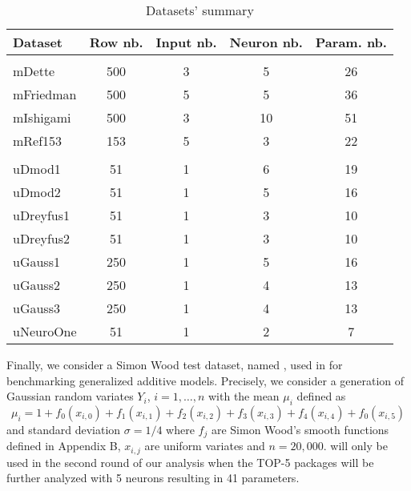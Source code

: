 \begin{Schunk}
\begin{table}

\caption{\label{tab:unnamed-chunk-2}Datasets' summary}
\centering
\fontsize{7}{9}\selectfont
\begin{tabular}[t]{lcccc}
\toprule
Dataset & Row nb. & Input nb. & Neuron nb. & Param. nb.\\
\midrule
\addlinespace[0.3em]
\multicolumn{5}{l}{\textbf{Multivariate}}\\
\hspace{1em}mDette & 500 & 3 & 5 & 26\\
\hspace{1em}mFriedman & 500 & 5 & 5 & 36\\
\hspace{1em}mIshigami & 500 & 3 & 10 & 51\\
\hspace{1em}mRef153 & 153 & 5 & 3 & 22\\
\addlinespace[0.3em]
\multicolumn{5}{l}{\textbf{Univariate}}\\
\hspace{1em}uDmod1 & 51 & 1 & 6 & 19\\
\hspace{1em}uDmod2 & 51 & 1 & 5 & 16\\
\hspace{1em}uDreyfus1 & 51 & 1 & 3 & 10\\
\hspace{1em}uDreyfus2 & 51 & 1 & 3 & 10\\
\hspace{1em}uGauss1 & 250 & 1 & 5 & 16\\
\hspace{1em}uGauss2 & 250 & 1 & 4 & 13\\
\hspace{1em}uGauss3 & 250 & 1 & 4 & 13\\
\hspace{1em}uNeuroOne & 51 & 1 & 2 & 7\\
\bottomrule
\end{tabular}
\end{table}

\end{Schunk}

Finally, we consider a Simon Wood test dataset, named ,
used in \citep{wood2011fast} for benchmarking generalized additive
models. Precisely, we consider a generation of Gaussian random variates
\(Y_i\), \(i=1,\dots,n\) with the mean \(\mu_i\) defined as \[
\mu_i = 1+ f_0(x_{i,0})+f_1(x_{i,1})+f_2(x_{i,2})+f_3(x_{i,3})
+f_4(x_{i,4})+f_0(x_{i,5})
\] and standard deviation \(\sigma=1/4\) where \(f_j\) are Simon Wood's
smooth functions defined in Appendix B, \(x_{i,j}\) are uniform variates
and \(n=20,000\).  will only be used in the second round
of our analysis when the TOP-5 packages will be further analyzed with 5
neurons resulting in 41 parameters.

